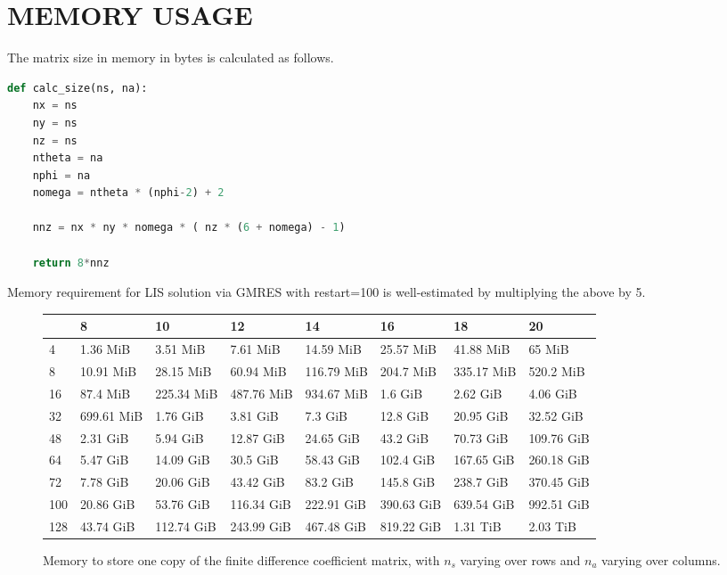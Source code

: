 \chapter{MEMORY USAGE}
\label{chap:memory_usage}

The matrix size in memory in bytes is calculated as follows.
\begin{lstlisting}[language=Python]
def calc_size(ns, na):
    nx = ns
    ny = ns
    nz = ns
    ntheta = na
    nphi = na
    nomega = ntheta * (nphi-2) + 2

    nnz = nx * ny * nomega * ( nz * (6 + nomega) - 1)

    return 8*nnz
\end{lstlisting}

Memory requirement for LIS solution via GMRES with restart=100 is well-estimated by multiplying the above by 5.

\begin{sidewaysfigure}
  \centering
  \caption{Memory to store one copy of the finite difference coefficient matrix, with $n_s$ varying over rows and $n_a$ varying over columns.}
  \begin{tabular}{llllllll}
  \toprule
  {} &          8  &          10 &          12 &          14 &          16 &          18 &          20 \\
  \midrule
  4   &    1.36 MiB &    3.51 MiB &    7.61 MiB &   14.59 MiB &   25.57 MiB &   41.88 MiB &      65 MiB \\
  8   &   10.91 MiB &   28.15 MiB &   60.94 MiB &  116.79 MiB &   204.7 MiB &  335.17 MiB &   520.2 MiB \\
  16  &    87.4 MiB &  225.34 MiB &  487.76 MiB &  934.67 MiB &     1.6 GiB &    2.62 GiB &    4.06 GiB \\
  32  &  699.61 MiB &    1.76 GiB &    3.81 GiB &     7.3 GiB &    12.8 GiB &   20.95 GiB &   32.52 GiB \\
  48  &    2.31 GiB &    5.94 GiB &   12.87 GiB &   24.65 GiB &    43.2 GiB &   70.73 GiB &  109.76 GiB \\
  64  &    5.47 GiB &   14.09 GiB &    30.5 GiB &   58.43 GiB &   102.4 GiB &  167.65 GiB &  260.18 GiB \\
  72  &    7.78 GiB &   20.06 GiB &   43.42 GiB &    83.2 GiB &   145.8 GiB &   238.7 GiB &  370.45 GiB \\
  100 &   20.86 GiB &   53.76 GiB &  116.34 GiB &  222.91 GiB &  390.63 GiB &  639.54 GiB &  992.51 GiB \\
  128 &   43.74 GiB &  112.74 GiB &  243.99 GiB &  467.48 GiB &  819.22 GiB &    1.31 TiB &    2.03 TiB \\
  \bottomrule
  \end{tabular}
\end{sidewaysfigure}

